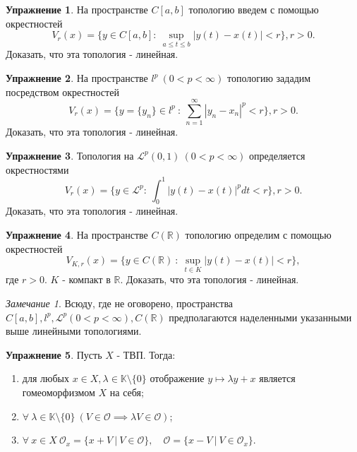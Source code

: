 \documentclass[a4paper, 12pt]{article}
\theoremstyle{definition}
\newtheorem{problem}{Упражнение}[section]
\theoremstyle{remark}
\newtheorem*{remark}{Замечание}
\begin{document}
\begin{problem}
    На пространстве $C[a, b]$ топологию введем с помощью окрестностей
    \[V_r(x) = \{y\in C[a, b] : \ \sup_{a \le t \le b} |y(t) - x(t)| < r\}, r > 0.\]
    Доказать, что эта топология - линейная.
\end{problem}
\begin{problem}
    На пространстве $l^p \ (0 < p < \infty)$ топологию зададим посредством окрестностей
    \[V_r(x) = \{y = \{y_n\}\in l^p \ : \ \sum_{n=1}^{\infty}|y_n-x_n|^p< r\}, r>0.\]
    Доказать, что эта топология - линейная.
\end{problem}
\begin{problem}
    Топология на $\mathscr{L}^p (0, 1) \ (0 < p < \infty)$ определяется окрестностями
    \[V_r(x) = \{y\in \mathscr{L}^p : \ \int_0^1 |y(t) - x(t)|^p dt < r\}, r > 0.\]
    Доказать, что эта топология - линейная.
\end{problem}
\begin{problem}
    На пространстве $C(\mathbb{R})$ топологию определим с помощью окрестностей
    \[V_{K, r}(x) = \{y\in C(\mathbb{R})\ : \ \sup_{t\in K} |y(t) - x(t)|< r\},\]
    где $r > 0$. $K$ - компакт в $\mathbb{R}$.
    Доказать, что эта топология - линейная.
\end{problem}
\begin{remark}
    Всюду, где не оговорено, пространства $C[a, b], l^p, \mathscr{L}^p (0 < p < \infty), C(\mathbb{R})$
    предполагаются наделенными указанными выше линейными топологиями.
\end{remark}
\begin{problem}
    Пусть $X$ - ТВП. Тогда:
    \begin{enumerate}
        \item для любых $x\in X, \lambda \in \mathbb{K}\setminus \{0\}$
        отображение $y\longmapsto \lambda y + x$ является гомеоморфизмом
        $X$ на себя;
        \item $\forall \ \lambda \in \mathbb{K}\setminus \{0\} \ (V\in \mathcal{O} \implies \lambda V\in \mathcal{O})$;
        \item $\forall \ x \in X \ \mathcal{O}_x = \{x + V \ | \ V\in \mathcal{O}\}, \quad \mathcal{O} = \{x - V \ | \ V\in \mathcal{O}_x\}$.
    \end{enumerate}
\end{problem}
\end{document}
